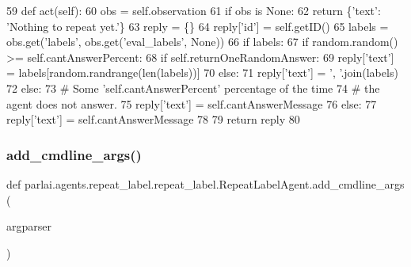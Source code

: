 \begin{DoxyCode}
59     \textcolor{keyword}{def }act(self):
60         obs = self.observation
61         \textcolor{keywordflow}{if} obs \textcolor{keywordflow}{is} \textcolor{keywordtype}{None}:
62             \textcolor{keywordflow}{return} \{\textcolor{stringliteral}{'text'}: \textcolor{stringliteral}{'Nothing to repeat yet.'}\}
63         reply = \{\}
64         reply[\textcolor{stringliteral}{'id'}] = self.getID()
65         labels = obs.get(\textcolor{stringliteral}{'labels'}, obs.get(\textcolor{stringliteral}{'eval\_labels'}, \textcolor{keywordtype}{None}))
66         \textcolor{keywordflow}{if} labels:
67             \textcolor{keywordflow}{if} random.random() >= self.cantAnswerPercent:
68                 \textcolor{keywordflow}{if} self.returnOneRandomAnswer:
69                     reply[\textcolor{stringliteral}{'text'}] = labels[random.randrange(len(labels))]
70                 \textcolor{keywordflow}{else}:
71                     reply[\textcolor{stringliteral}{'text'}] = \textcolor{stringliteral}{', '}.join(labels)
72             \textcolor{keywordflow}{else}:
73                 \textcolor{comment}{# Some 'self.cantAnswerPercent' percentage of the time}
74                 \textcolor{comment}{# the agent does not answer.}
75                 reply[\textcolor{stringliteral}{'text'}] = self.cantAnswerMessage
76         \textcolor{keywordflow}{else}:
77             reply[\textcolor{stringliteral}{'text'}] = self.cantAnswerMessage
78 
79         \textcolor{keywordflow}{return} reply
80 \end{DoxyCode}
\mbox{\label{classparlai_1_1agents_1_1repeat__label_1_1repeat__label_1_1RepeatLabelAgent_a8b226276eb5fee84571f4dc84d967aa3}} 
\subsubsection{\texorpdfstring{add\+\_\+cmdline\+\_\+args()}{add\_cmdline\_args()}}
{\footnotesize\ttfamily def parlai.\+agents.\+repeat\+\_\+label.\+repeat\+\_\+label.\+Repeat\+Label\+Agent.\+add\+\_\+cmdline\+\_\+args (\begin{DoxyParamCaption}\item[{}]{argparser }\end{DoxyParamCaption})\hspace{0.3cm}{\ttfamily [static]}}



